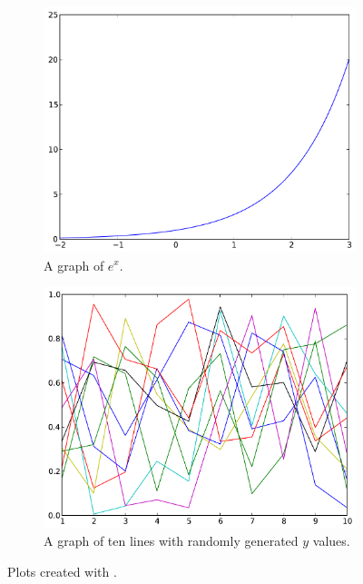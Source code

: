 \begin{figure}
\centering
\begin{subfigure}[t]{.49\textwidth}
\centering
\includegraphics[width=\textwidth]{exp_plot.pdf}
\caption{A graph of $e^x$.}
\label{fig:exp_plot}
\end{subfigure}
\begin{subfigure}[t]{.49\textwidth}
\centering
\includegraphics[width=\textwidth]{statemachine.pdf}
\caption{A graph of ten lines with randomly generated $y$ values.}
\label{fig:statemachine}
\end{subfigure}
\caption{Plots created with .}
\label{fig:lineplots}
\end{figure}


